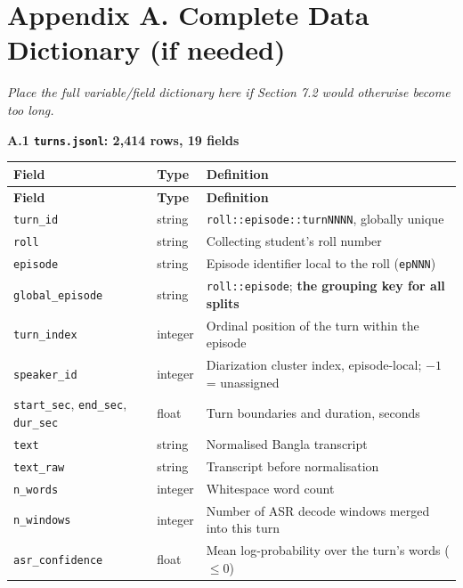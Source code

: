 \documentclass[11pt,a4paper]{article}
\newcommand{\thd}[1]{\textbf{\sffamily\small #1}}          %
\begin{document}
\clearpage

\section*{\sffamily Appendix A. Complete Data Dictionary (if needed)}

\emph{\small Place the full variable/field dictionary here if Section 7.2 would otherwise become
too long.}

\textbf{A.1 \texttt{turns.jsonl}: 2{,}414 rows, 19 fields}

\begin{longtable}{|L{3.4cm}|L{2.0cm}|L{9.6cm}|}
\hline
\thd{Field} & \thd{Type} & \thd{Definition} \\ \hline
\endfirsthead
\hline \thd{Field} & \thd{Type} & \thd{Definition} \\ \hline \endhead
\texttt{turn\_id}               & string  & \texttt{roll::episode::turnNNNN}, globally unique \\ \hline
\texttt{roll}                   & string  & Collecting student's roll number \\ \hline
\texttt{episode}                & string  & Episode identifier local to the roll (\texttt{epNNN}) \\ \hline
\texttt{global\_episode}        & string  & \texttt{roll::episode}; \textbf{the grouping key for all splits} \\ \hline
\texttt{turn\_index}            & integer & Ordinal position of the turn within the episode \\ \hline
\texttt{speaker\_id}            & integer & Diarization cluster index, episode-local; $-1$ = unassigned \\ \hline
\texttt{start\_sec}, \texttt{end\_sec}, \texttt{dur\_sec} & float & Turn boundaries and duration, seconds \\ \hline
\texttt{text}                   & string  & Normalised Bangla transcript \\ \hline
\texttt{text\_raw}              & string  & Transcript before normalisation \\ \hline
\texttt{n\_words}               & integer & Whitespace word count \\ \hline
\texttt{n\_windows}             & integer & Number of ASR decode windows merged into this turn \\ \hline
\texttt{asr\_confidence}        & float   & Mean log-probability over the turn's words ($\le 0$) \\ \hline

\end{longtable}
\end{document}
